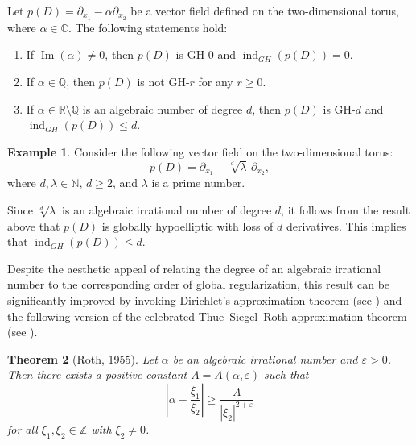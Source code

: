 \documentclass[11pt]{amsart}
\numberwithin{equation}{section}
\newtheorem{theorem}{Theorem}[section]
\theoremstyle{definition}
\newtheorem{example}[theorem]{Example}
\begin{document}
		Let \( p(D) = \partial_{x_1} - \alpha \partial_{x_2} \) be a vector field defined on the two-dimensional torus, where \( \alpha\in \mathbb{C} \). The following statements hold:
		\begin{enumerate}
			\item[{\it (i)}] If  \( \operatorname{Im}(\alpha) \neq 0 \), then \( p(D) \) is GH-\( 0 \) and \( \operatorname{ind}_{GH}(p(D)) = 0 \).
			\item[{\it (ii)}] If  \( \alpha \in \mathbb{Q} \), then \( p(D) \) is not GH-\( r \) for any \( r \geq 0 \).
			\item[{\it (iii)}] If \( \alpha \in \mathbb{R}\setminus\mathbb{Q} \) is an algebraic number of degree \( d \), then \( p(D) \) is GH-\( d \) and \( \operatorname{ind}_{GH}(p(D)) \leq d \).
		\end{enumerate}
        
	\begin{example}
		Consider the following vector field on the two-dimensional torus:
		\begin{equation*}
			p(D) = \partial_{x_1} - \sqrt[d]{\lambda} \, \partial_{x_2},
		\end{equation*}
		where \( d, \lambda \in \mathbb{N} \), \( d \geq 2 \), and \( \lambda \) is a prime number.
		
		Since \( \sqrt[d]{\lambda} \) is an algebraic irrational number of degree \( d \), it follows from the result above that \( p(D) \) is globally hypoelliptic with loss of \( d \) derivatives. This implies that $\operatorname{ind}_{GH}(p(D))\leq d$. 
	\end{example}
	
	Despite the aesthetic appeal of relating the degree of an algebraic irrational number to the corresponding order of global regularization, this result can be significantly improved by invoking Dirichlet's approximation theorem (see \cite{Schmidt_Diophantine_Book}) and the following version of the celebrated Thue--Siegel--Roth approximation theorem (see \cite{Roth1955}).
	
	\begin{theorem}[Roth, 1955]\label{Roth-Thm}
		Let \( \alpha \) be an algebraic irrational number and \( \varepsilon > 0 \). Then there exists a positive constant \( A = A(\alpha, \varepsilon) \) such that
		\begin{equation}\label{roth}
			\left| \alpha - \frac{\xi_1}{\xi_2} \right| \geq \frac{A}{|\xi_2|^{2+\varepsilon}}
		\end{equation}
		for all \( \xi_1, \xi_2 \in \mathbb{Z} \) with \( \xi_2 \neq 0 \).
	\end{theorem}
	
\end{document}
